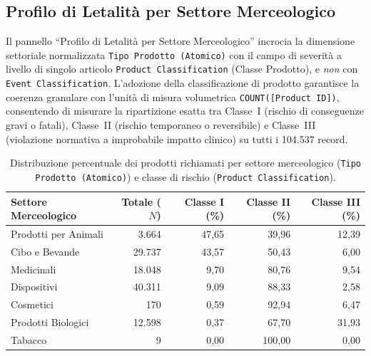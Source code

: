 \subsection{Profilo di Letalità per Settore Merceologico}

Il pannello ``Profilo di Letalità per Settore Merceologico'' incrocia la dimensione settoriale normalizzata \texttt{Tipo Prodotto (Atomico)} con il campo di severità a livello di singolo articolo \texttt{Product Classification} (Classe Prodotto), e \emph{non} con \texttt{Event Classification}. L'adozione della classificazione di prodotto garantisce la coerenza granulare con l'unità di misura volumetrica \texttt{COUNT([Product ID])}, consentendo di misurare la ripartizione esatta tra Classe~I (rischio di conseguenze gravi o fatali), Classe~II (rischio temporaneo o reversibile) e Classe~III (violazione normativa a improbabile impatto clinico) \citep{fda_recall_classes} su tutti i 104.537 record.

\begin{table}[htbp]
\centering
\caption{Distribuzione percentuale dei prodotti richiamati per settore merceologico (\texttt{Tipo Prodotto (Atomico)}) e classe di rischio (\texttt{Product Classification}).}
\label{tab:tableau_sector_lethality}
\begin{tabularx}{\textwidth}{@{}Xrrrr@{}}
\toprule
\textbf{Settore Merceologico} & \textbf{Totale ($N$)} & \textbf{Classe I (\%)} & \textbf{Classe II (\%)} & \textbf{Classe III (\%)} \\
\midrule
Prodotti per Animali & 3.664 & 47,65 & 39,96 & 12,39 \\
Cibo e Bevande & 29.737 & 43,57 & 50,43 & 6,00 \\
Medicinali & 18.048 & 9,70 & 80,76 & 9,54 \\
Dispositivi & 40.311 & 9,09 & 88,33 & 2,58 \\
Cosmetici & 170 & 0,59 & 92,94 & 6,47 \\
Prodotti Biologici & 12.598 & 0,37 & 67,70 & 31,93 \\
Tabacco & 9 & 0,00 & 100,00 & 0,00 \\
\bottomrule
\end{tabularx}
\end{table}

